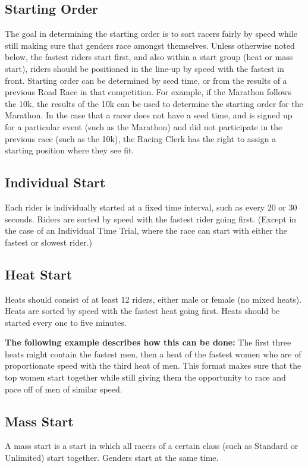 \subsection{Starting Order}
The goal in determining the starting order is to sort racers fairly by speed while still making sure that genders race amongst themselves.
Unless otherwise noted below, the fastest riders start first, and also within a start group (heat or mass start), riders should be positioned in the line-up by speed with the fastest in front.
Starting order can be determined by seed time, or from the results of a previous Road Race in that competition.
For example, if the Marathon follows the 10k, the results of the 10k can be used to determine the starting order for the Marathon.
In the case that a racer does not have a seed time, and is signed up for a particular event (such as the Marathon) and did not participate in the previous race (such as the 10k), the Racing Clerk has the right to assign a starting position where they see fit.

\subsection{Individual Start \label{subsec:road_heat-assignment_individual-start}}
Each rider is individually started at a fixed time interval, such as every 20 or 30 seconds.
Riders are sorted by speed with the fastest rider going first.
(Except in the case of an Individual Time Trial, where the race can start with either the fastest or slowest rider.)

\subsection{Heat Start \label{subsec:road_heat-assignment_heat-start}}
Heats should consist of at least 12 riders, either male or female (no mixed heats).
Heats are sorted by speed with the fastest heat going first.
Heats should be started every one to five minutes.

\textbf{The following example describes how this can be done:}
The first three heats might contain the fastest men, then a heat of the fastest women who are of proportionate speed with the third heat of men.
This format makes sure that the top women start together while still giving them the opportunity to race and pace off of men of similar speed.

\subsection{Mass Start \label{subsec:road_heat-assignment_mass-start}}
A mass start is a start in which all racers of a certain class (such as Standard or Unlimited) start together.
Genders start at the same time.

